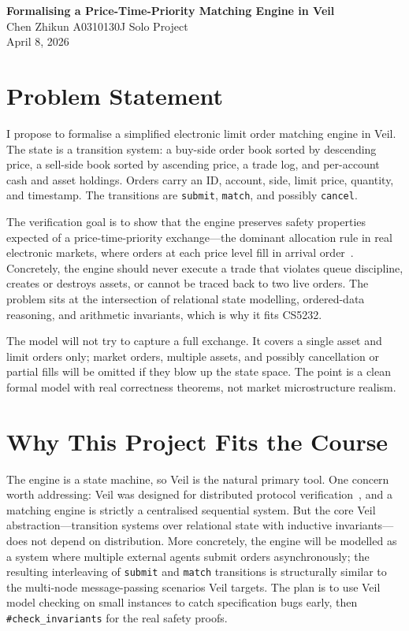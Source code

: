 \documentclass[11pt]{article}
\begin{document}
\begin{center}
{\Large\bfseries Formalising a Price-Time-Priority Matching Engine in Veil}\\[6pt]
Chen Zhikun \;\textbar\; A0310130J \;\textbar\; Solo Project\\[2pt]
{\small April 8, 2026}
\end{center}

\medskip

\section{Problem Statement}

I propose to formalise a simplified electronic limit order matching engine in
Veil. The state is a transition system: a buy-side order book sorted by
descending price, a sell-side book sorted by ascending price, a trade log,
and per-account cash and asset holdings. Orders carry an ID, account, side,
limit price, quantity, and timestamp. The transitions are \texttt{submit},
\texttt{match}, and possibly \texttt{cancel}.

The verification goal is to show that the engine preserves safety properties
expected of a price-time-priority exchange---the dominant allocation rule in
real electronic markets, where orders at each price level fill in arrival
order~\cite{harris}. Concretely, the engine should never execute a trade that
violates queue discipline, creates or destroys assets, or cannot be traced
back to two live orders. The problem sits at the intersection of relational
state modelling, ordered-data reasoning, and arithmetic invariants, which is
why it fits CS5232.

The model will not try to capture a full exchange. It covers a single asset
and limit orders only; market orders, multiple assets, and possibly
cancellation or partial fills will be omitted if they blow up the state space.
The point is a clean formal model with real correctness theorems, not market
microstructure realism.

\section{Why This Project Fits the Course}

The engine is a state machine, so Veil is the natural primary tool.
One concern worth addressing: Veil was designed for distributed protocol
verification~\cite{veilpost}, and a matching engine is strictly a centralised
sequential system. But the core Veil abstraction---transition systems over
relational state with inductive invariants---does not depend on distribution.
More concretely, the engine will be modelled as a system where multiple
external agents submit orders asynchronously; the resulting interleaving of
\texttt{submit} and \texttt{match} transitions is structurally similar to the
multi-node message-passing scenarios Veil targets. The plan is to use Veil
model checking on small instances to catch specification bugs early, then
\texttt{\#check\_invariants} for the real safety proofs.
\end{document}
